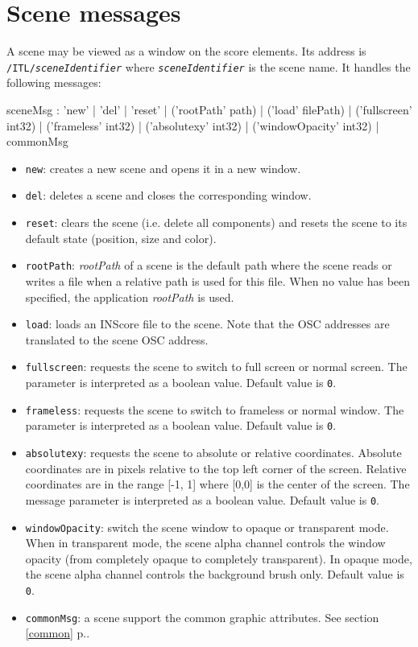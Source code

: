 \documentclass[a4paper,twoside]{report}
\newcommand{\toplevel}[1]	{\chapter{#1}}
\newcommand{\fullref}[1]	{\ref{#1} p.\pageref{#1}}
\newcommand{\OSC}[1]		{\texttt{#1}}
\newcommand{\values}[1]	{\texttt{#1}}
\begin{document}
\toplevel{Scene messages}
\label{scene}
A scene may be viewed as a window on the score elements. Its address is \OSC{/ITL/\textit{sceneIdentifier}} where \OSC{\textit{sceneIdentifier}} is the scene name. It handles the following messages:
\begin{rail}
sceneMsg :  'new'
			| 'del'
			| 'reset'
			| ('rootPath' path) 
			| ('load' filePath)
			| ('fullscreen' int32)
			| ('frameless' int32)
			| ('absolutexy' int32)
			| ('windowOpacity' int32)
			| commonMsg
\end{rail}

\begin{itemize}
\item \OSC{new}: creates a new scene and opens it in a new window.
\item \OSC{del}: deletes a scene and closes the corresponding window.
\item \OSC{reset}: clears the scene (i.e. delete all components) and resets the scene to its default state (position, size and color).
\item \OSC{rootPath}: \emph{rootPath} of a scene is the default path where the scene reads or writes a file when a relative path is used for this file. When no value has been specified, the application  \emph{rootPath} is used.
\item \OSC{load}: loads an INScore file to the scene. Note that the OSC addresses are translated to the scene OSC address.
\item \OSC{fullscreen}: requests the scene to switch to full screen or normal screen.  The parameter is interpreted as a boolean value. Default value is \values{0}.
\item \OSC{frameless}: requests the scene to switch to frameless or normal window.  The parameter is interpreted as a boolean value. Default value is \values{0}.
\item \OSC{absolutexy}: requests the scene to absolute or relative coordinates. Absolute coordinates are in pixels relative to the top left corner of the screen. Relative coordinates are in the range [-1, 1] where [0,0] is the center of the screen. The message parameter is interpreted as a boolean value. Default value is \values{0}.
\item \OSC{windowOpacity}: switch the scene window to opaque or transparent mode. When in transparent mode, the scene alpha channel controls the window opacity (from completely opaque to completely transparent). In opaque mode, the scene alpha channel controls the background brush only. Default value is \values{0}.
\item \OSC{commonMsg}: a scene support the common graphic attributes. See section \fullref{common}.
\end{itemize}
\end{document}
